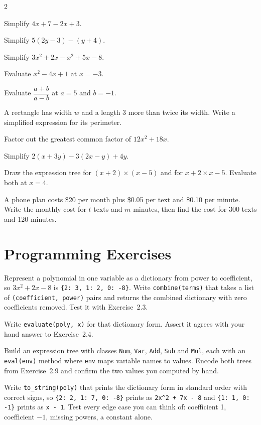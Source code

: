 \begin{multicols}{2}
\begin{exercises}
\item Simplify $4x + 7 - 2x + 3$.
\item Simplify $5(2y - 3) - (y + 4)$.
\item Simplify $3x^2 + 2x - x^2 + 5x - 8$.
\item Evaluate $x^2 - 4x + 1$ at $x = -3$.
\item Evaluate $\dfrac{a + b}{a - b}$ at $a = 5$ and $b = -1$.
\item A rectangle has width $w$ and a length 3 more than twice its width. Write a simplified expression for its perimeter.
\item Factor out the greatest common factor of $12x^2 + 18x$.
\item Simplify $2(x + 3y) - 3(2x - y) + 4y$.
\item Draw the expression tree for $(x + 2) \times (x - 5)$ and for $x + 2 \times x - 5$. Evaluate both at $x = 4$.
\item A phone plan costs \$20 per month plus \$0.05 per text and \$0.10 per minute. Write the monthly cost for $t$ texts and $m$ minutes, then find the cost for 300 texts and 120 minutes.
\end{exercises}
\end{multicols}

\section{Programming Exercises}

\begin{codeexercises}
\item Represent a polynomial in one variable as a dictionary from power to coefficient, so $3x^2 + 2x - 8$ is \lstinline!{2: 3, 1: 2, 0: -8}!. Write \lstinline!combine(terms)! that takes a list of \lstinline!(coefficient, power)! pairs and returns the combined dictionary with zero coefficients removed. Test it with Exercise~2.3.
\item Write \lstinline!evaluate(poly, x)! for that dictionary form. Assert it agrees with your hand answer to Exercise~2.4.
\item Build an expression tree with classes \lstinline!Num!, \lstinline!Var!, \lstinline!Add!, \lstinline!Sub! and \lstinline!Mul!, each with an \lstinline!eval(env)! method where \lstinline!env! maps variable names to values. Encode both trees from Exercise~2.9 and confirm the two values you computed by hand.
\item Write \lstinline!to_string(poly)! that prints the dictionary form in standard order with correct signs, so \lstinline!{2: 2, 1: 7, 0: -8}! prints as \lstinline!2x^2 + 7x - 8! and \lstinline!{1: 1, 0: -1}! prints as \lstinline!x - 1!. Test every edge case you can think of: coefficient 1, coefficient $-1$, missing powers, a constant alone.
\end{codeexercises}
